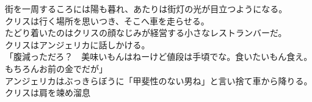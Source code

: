 \documentclass[b5j,10pt,openany]{jsbook}
\begin{document}
街を一周するころには陽も暮れ、あたりは街灯の光が目立つようになる。\\クリスは行く場所を思いつき、そこへ車を走らせる。\\たどり着いたのはクリスの顔なじみが経営する小さなレストランバーだ。\\クリスはアンジェリカに話しかける。\\「腹減っただろ？　美味いもんはねーけど値段は手頃でな。食いたいもん食え。もちろんお前の金でだが」\\アンジェリカはぶっきらぼうに「甲斐性のない男ね」と言い捨て車から降りる。クリスは肩を竦め溜息
\end{document}
